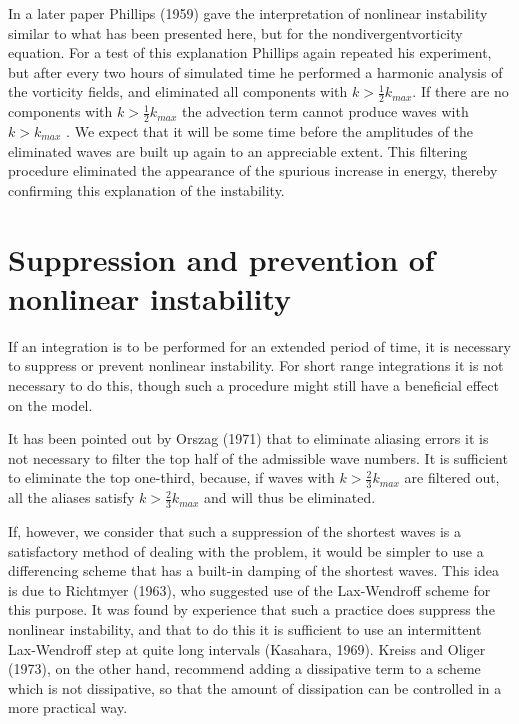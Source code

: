 In a later paper Phillips (1959) gave the interpretation of nonlinear
instability similar to what has been presented here, but for the
nondivergentvorticity equation. For a test of this explanation Phillips
again repeated his experiment, but after every two hours of simulated
time he performed a harmonic analysis of the vorticity fields, and
eliminated all components with \(k > \frac{1}{2}k_{max}\). If there are
no components with \(k > \frac{1}{2}k_{max}\) the advection term cannot
produce waves with \(k > k_{max}\) . We expect that it will be some time
before the amplitudes of the eliminated waves are built up again to an
appreciable extent. This filtering procedure eliminated the appearance
of the spurious increase in energy, thereby confirming this explanation
of the instability.

\section{Suppression and prevention of nonlinear instability}\label{sec:suppression-and-prevention-of-nonlinear-instability}

If an integration is to be performed for an extended period of time, it
is necessary to suppress or prevent nonlinear instability. For short
range integrations it is not necessary to do this, though such a
procedure might still have a beneficial effect on the model.

It has been pointed out by Orszag (1971) that to eliminate aliasing
errors it is not necessary to filter the top half of the admissible wave
numbers. It is sufficient to eliminate the top one-third, because, if
waves with \(k > \frac{2}{3}k_{max}\) are filtered out, all the aliases
satisfy \(k > \frac{2}{3}k_{max}\) and will thus be eliminated.

If, however, we consider that such a suppression of the shortest waves
is a satisfactory method of dealing with the problem, it would be
simpler to use a differencing scheme that has a built-in damping of the
shortest waves. This idea is due to Richtmyer (1963), who suggested use
of the Lax-Wendroff scheme for this purpose. It was found by experience
that such a practice does suppress the nonlinear instability, and that
to do this it is sufficient to use an intermittent Lax-Wendroff step at
quite long intervals (Kasahara, 1969). Kreiss and Oliger (1973), on the
other hand, recommend adding a dissipative term to a scheme which is not
dissipative, so that the amount of dissipation can be controlled in a
more practical way.

